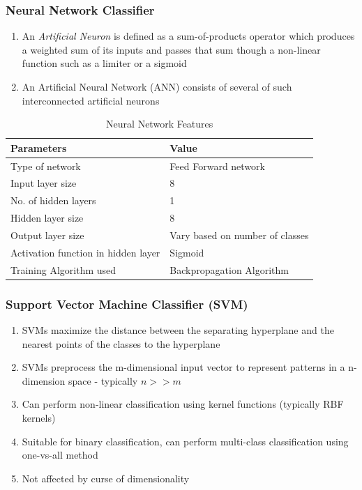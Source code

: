 \documentclass[unknownkeysallowed]{beamer}
\begin{document}
\begin{frame}
	\frametitle{Neural Network Classifier}
    \begin{enumerate}
      \item An \textit{Artificial Neuron} is defined as a sum-of-products operator which produces a weighted sum of its inputs and passes that sum though a non-linear function such as a limiter or a sigmoid
      \pause
      \item An Artificial Neural Network (ANN) consists of several of such interconnected artificial neurons
      \pause
    \end{enumerate}
    \small{
    \begin{table}[h!]
      \centering
      \caption{Neural Network Features}
      \label{NN_features}
      \begin{tabular}{l l}
      \hline
      Parameters &Value\\\hline
      Type of network &Feed Forward network\\
      Input layer size &8\\
      No. of hidden layers &1\\
      Hidden layer size &8\\
      Output layer size &Vary based on number of classes\\
      Activation function in hidden layer &Sigmoid\\
      Training Algorithm used &Backpropagation Algorithm
      \end{tabular}
    \end{table}}
\end{frame}

\begin{frame}
	\frametitle{Support Vector Machine Classifier (SVM)}
    \begin{enumerate}
    \item SVMs maximize the distance between the separating hyperplane and the nearest points of the classes to the hyperplane
    \pause
    \item SVMs preprocess the m-dimensional input vector to represent patterns in a n-dimension space - typically $n>>m$
    \pause
    \item Can perform non-linear classification using kernel functions (typically RBF kernels)
    \pause
    \item Suitable for binary classification, can perform multi-class classification using one-vs-all method
    \pause
    \item Not affected by curse of dimensionality
    \end{enumerate}
\end{frame}
\end{document}
